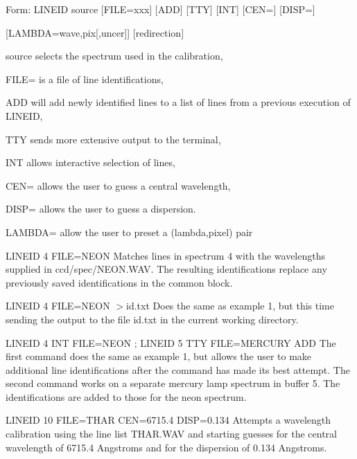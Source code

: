 {\newpage\clearpage
{}%
\begin{command}
  \item[Form: LINEID source {[FILE=xxx]} {[ADD]} {[TTY]} {[INT]} {[CEN=]} 
       {[DISP=]}\hfill]{}
  \item{{[LAMBDA=wave,pix{[,uncer]}]} {[redirection]}}
  \item[source]{selects the spectrum used in the calibration,}
  \item[FILE=]{is a file of line identifications,}
  \item[ADD]{will add newly identified lines to a list
       of lines from a previous execution of LINEID,}
  \item[TTY]{sends more extensive output to the terminal,}
  \item[INT]{allows interactive selection of lines,}
  \item[CEN=]{allows the user to guess a central wavelength,}
  \item[DISP=]{allows the user to guess a dispersion.}
  \item[LAMBDA=]{allow the user to preset a (lambda,pixel) pair}
\end{command}%
\lthtmlfigureZ
\lthtmlcheckvsize\clearpage}

{\newpage\clearpage
{}%
\begin{example}
  \item[LINEID 4 FILE=NEON\hfill]{Matches lines in spectrum 4 with the
       wavelengths supplied in ccd/spec/NEON.WAV.  The resulting
       identifications replace any previously saved identifications in the
       common block.}
\par\item[LINEID 4 FILE=NEON $>$id.txt\hfill]{Does the same as example 1, but
       this time sending the output to the file id.txt in the current
       working directory.}
\par\item[LINEID 4 INT FILE=NEON ; LINEID 5 TTY FILE=MERCURY ADD\hfill]{The
       first command does the same as example 1, but allows the user to
       make additional line identifications after the command has made its
       best attempt.  The second command works on a separate mercury lamp
       spectrum in buffer 5.  The identifications are added to those for
       the neon spectrum.}
\par\item[LINEID 10 FILE=THAR CEN=6715.4 DISP=0.134\hfill]{Attempts a
       wavelength calibration using the line list THAR.WAV and starting
       guesses for the central wavelength of 6715.4 Angstroms and for the
       dispersion of 0.134 Angstroms.}
\end{example}%
\lthtmlfigureZ
\lthtmlcheckvsize\clearpage}

